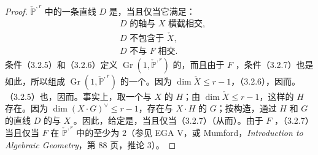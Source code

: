 \begin{proof}
$\check{\mathbb P}^{,r}$ 中的一条直线 $D$ 是，当且仅当它满足：
\begin{align}
&D\text{ 的轴与 }X\text{ 横截相交},\tag{3.2.5}\\
&D\text{ 不包含于 }\check X,\tag{3.2.6}\\
&D\text{ 不与 }F\text{ 相交}.\tag{3.2.7}
\end{align}
条件（3.2.5）和（3.2.6）定义 $\operatorname{Gr}(1,\check{\mathbb P}^{,r})$ 的，而且由于 $F$ ，条件（3.2.7）也是如此，所以组成 $\operatorname{Gr}(1,\check{\mathbb P}^{,r})$ 的一个。因为 $\dim\check X\leq r-1$，（3.2.6），因而。（3.2.5）也，因而。事实上，取一个与 $X$ 的 $H$；由 $\dim\check X\leq r-1$，这样的 $H$ 存在。因为 $\dim (X\cdot G)^{\vee}\leq r-1$，存在与 $X\cdot H$ 的 $G$；按构造，通过 $H$ 和 $G$ 的直线 $D$ 的与 $X$ 。因此，给定是，当且仅当（3.2.7）（从而）。由于 $F$ ，（3.2.7）当且仅当 $F$ 在 $\check{\mathbb P}^{,r}$ 中的至少为 $2$（参见 EGA V，或 Mumford，\textit{Introduction to Algebraic Geometry}，第 88 页，推论 3）。
\end{proof}

